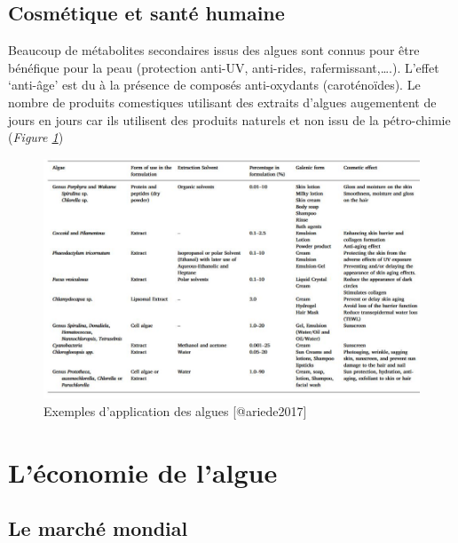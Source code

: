 \documentclass[
]{book}
\begin{document}
\hypertarget{cosmuxe9tique-et-santuxe9-humaine}{%
\subsection{Cosmétique et santé humaine}\label{cosmuxe9tique-et-santuxe9-humaine}}

Beaucoup de métabolites secondaires issus des algues sont connus pour être bénéfique pour la peau (protection anti-UV, anti-rides, rafermissant,\ldots.). L'effet `anti-âge' est du à la présence de composés anti-oxydants (caroténoïdes). Le nombre de produits comestiques utilisant des extraits d'algues augementent de jours en jours car ils utilisent des produits naturels et non issu de la pétro-chimie \citep{ariede2017} (\emph{Figure \ref{fig:cosmetique}})

\begin{figure}

{\centering \includegraphics[width=13.06in]{images/cosmetique} 

}

\caption{Exemples d'application des algues [@ariede2017]}\label{fig:cosmetique}
\end{figure}

\hypertarget{luxe9conomie-de-lalgue}{%
\section{L'économie de l'algue}\label{luxe9conomie-de-lalgue}}

\hypertarget{le-marchuxe9-mondial}{%
\subsection{Le marché mondial}\label{le-marchuxe9-mondial}}
\end{document}

